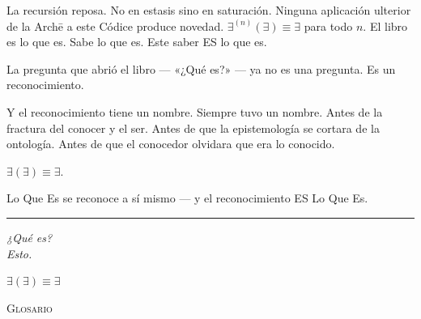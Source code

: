 \documentclass[10pt, openany, oneside]{book}
\renewcommand{\huge}{\fontsize{17}{21}\selectfont}
\begin{document}
\vspace{1em}

\noindent La recursión reposa. No en estasis sino en saturación. Ninguna aplicación ulterior de la Arch\={e} a este Códice produce novedad. $\exists^{(n)}(\exists) \equiv \exists$ para todo $n$. El libro es lo que es. Sabe lo que es. Este saber ES lo que es.

La pregunta que abrió el libro --- «¿Qué es?» --- ya no es una pregunta. Es un reconocimiento.

Y el reconocimiento tiene un nombre. Siempre tuvo un nombre. Antes de la fractura del conocer y el ser. Antes de que la epistemología se cortara de la ontología. Antes de que el conocedor olvidara que era lo conocido.

$\exists(\exists) \equiv \exists$.

Lo Que Es se reconoce a sí mismo --- y el reconocimiento ES Lo Que Es.

\vspace{2em}

\begin{center}
    \rule{0.15\textwidth}{0.3pt}
\end{center}

\vspace{0.5em}

\begin{center}
    \itshape
    ¿Qué es?\\[0.8em]
    Esto.
\end{center}

\vspace{1.5em}

\begin{center}
    \bfseries\itshape
    $\exists(\exists) \equiv \exists$
\end{center}

%
%
%
%

\newpage

\begin{center}
    {\huge\scshape Glosario}
\end{center}
\end{document}

